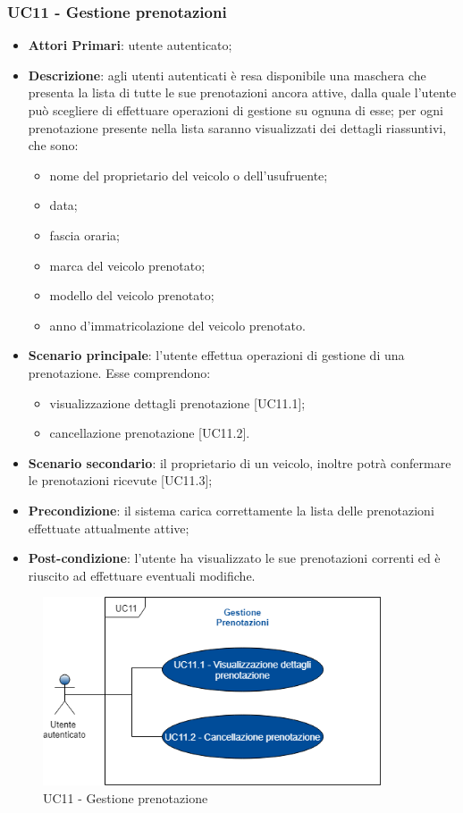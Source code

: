 \subsubsection{UC11 - Gestione prenotazioni}
\begin{itemize}
	\item \textbf{Attori Primari}: utente autenticato;
	\item \textbf{Descrizione}: agli utenti autenticati è resa disponibile una maschera che presenta la lista di tutte le sue prenotazioni ancora attive, dalla quale l'utente può scegliere di effettuare operazioni di gestione su ognuna di esse;
	per ogni prenotazione presente nella lista saranno visualizzati dei dettagli riassuntivi, che sono:
	\begin{itemize}
		\item nome del proprietario del veicolo o dell'usufruente;
		\item data;
		\item fascia oraria;
		\item marca del veicolo prenotato;
		\item modello del veicolo prenotato;
		\item anno d'immatricolazione del veicolo prenotato.
	\end{itemize}
	\item \textbf{Scenario principale}: l'utente effettua operazioni di gestione di una prenotazione. Esse comprendono:
	\begin{itemize}
		\item visualizzazione dettagli prenotazione [UC11.1];
		\item cancellazione prenotazione [UC11.2].
	\end{itemize}
	\item \textbf{Scenario secondario}: il proprietario di un veicolo, inoltre potrà confermare le prenotazioni ricevute [UC11.3];
	\item \textbf{Precondizione}: il sistema carica correttamente la lista delle prenotazioni effettuate attualmente attive;
	\item \textbf{Post-condizione}: l'utente ha visualizzato le sue prenotazioni correnti ed è riuscito ad effettuare eventuali modifiche.
\end{itemize} 
\begin{figure}[h]
	\includegraphics[width=10cm]{res/images/UC11Prenotazione.png}
	\centering
	\caption{UC11 - Gestione prenotazione}
\end{figure}
